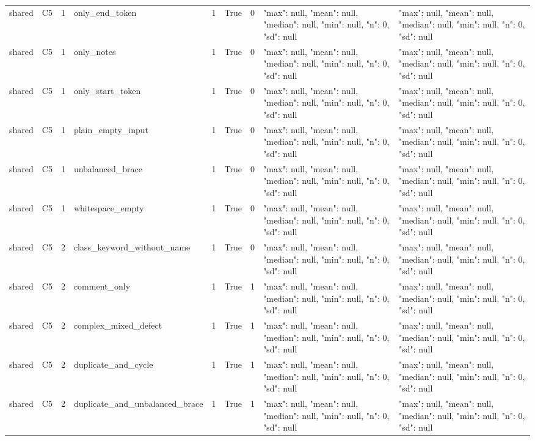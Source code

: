 \begin{tabular}{lllllllll}
shared & C5 & 1 & only\_end\_token & 1 & True & 0 & {"max": null, "mean": null, "median": null, "min": null, "n": 0, "sd": null} & {"max": null, "mean": null, "median": null, "min": null, "n": 0, "sd": null} \\
shared & C5 & 1 & only\_notes & 1 & True & 0 & {"max": null, "mean": null, "median": null, "min": null, "n": 0, "sd": null} & {"max": null, "mean": null, "median": null, "min": null, "n": 0, "sd": null} \\
shared & C5 & 1 & only\_start\_token & 1 & True & 0 & {"max": null, "mean": null, "median": null, "min": null, "n": 0, "sd": null} & {"max": null, "mean": null, "median": null, "min": null, "n": 0, "sd": null} \\
shared & C5 & 1 & plain\_empty\_input & 1 & True & 0 & {"max": null, "mean": null, "median": null, "min": null, "n": 0, "sd": null} & {"max": null, "mean": null, "median": null, "min": null, "n": 0, "sd": null} \\
shared & C5 & 1 & unbalanced\_brace & 1 & True & 0 & {"max": null, "mean": null, "median": null, "min": null, "n": 0, "sd": null} & {"max": null, "mean": null, "median": null, "min": null, "n": 0, "sd": null} \\
shared & C5 & 1 & whitespace\_empty & 1 & True & 0 & {"max": null, "mean": null, "median": null, "min": null, "n": 0, "sd": null} & {"max": null, "mean": null, "median": null, "min": null, "n": 0, "sd": null} \\
shared & C5 & 2 & class\_keyword\_without\_name & 1 & True & 0 & {"max": null, "mean": null, "median": null, "min": null, "n": 0, "sd": null} & {"max": null, "mean": null, "median": null, "min": null, "n": 0, "sd": null} \\
shared & C5 & 2 & comment\_only & 1 & True & 1 & {"max": null, "mean": null, "median": null, "min": null, "n": 0, "sd": null} & {"max": null, "mean": null, "median": null, "min": null, "n": 0, "sd": null} \\
shared & C5 & 2 & complex\_mixed\_defect & 1 & True & 1 & {"max": null, "mean": null, "median": null, "min": null, "n": 0, "sd": null} & {"max": null, "mean": null, "median": null, "min": null, "n": 0, "sd": null} \\
shared & C5 & 2 & duplicate\_and\_cycle & 1 & True & 1 & {"max": null, "mean": null, "median": null, "min": null, "n": 0, "sd": null} & {"max": null, "mean": null, "median": null, "min": null, "n": 0, "sd": null} \\
shared & C5 & 2 & duplicate\_and\_unbalanced\_brace & 1 & True & 1 & {"max": null, "mean": null, "median": null, "min": null, "n": 0, "sd": null} & {"max": null, "mean": null, "median": null, "min": null, "n": 0, "sd": null} \\

\end{tabular}
